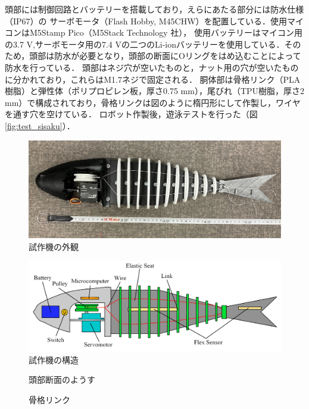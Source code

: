頭部には制御回路とバッテリーを搭載しており，えらにあたる部分には防水仕様（IP67）の サーボモータ（Flash Hobby, M45CHW）を配置している．使用マイコンはM5Stamp Pico（M5Stack Technology 社），
使用バッテリーはマイコン用の3.7 V,サーボモータ用の7.4 Vの二つのLi-ionバッテリーを使用している．そのため，頭部は防水が必要となり，頭部の断面にOリングをはめ込むことによって防水を行っている．
頭部はネジ穴が空いたものと，ナット用の穴が空いたものに分かれており，これらはM1.7ネジで固定される．
胴体部は骨格リンク（PLA樹脂）と弾性体（ポリプロピレン板，厚さ0.75 mm），尾びれ（TPU樹脂，厚さ2 mm）で構成されており，骨格リンクは図のように楕円形にして作製し，ワイヤを通す穴を空けている．
ロボット作製後，遊泳テストを行った（図\ref{fig:test_sisaku}）．

\begin{figure}[t]
    \centering
    \includegraphics[width=0.80\linewidth]{chapters/picture/sisaku.jpg}
    \caption{試作機の外観}
    \label{fig:sisaku}
\end{figure}
\begin{figure}[t]
    \centering
    \includegraphics[width=0.80\linewidth]{chapters/picture/tentativeschematic.png}
    \caption{試作機の構造}
    \label{fig:kouzou_sisaku}
\end{figure}
\begin{figure}[t]
    \centering
     \begin{minipage}[b]{0.50\linewidth}
        \centering
        \caption{頭部断面のようす}
        \label{fig:danmen}
     \end{minipage}
     \hspace{0.05\linewidth}
     \begin{minipage}[b]{0.25\linewidth}
        \centering
        \caption{骨格リンク}
        \label{fig:link_sen}
     \end{minipage}
\end{figure}

